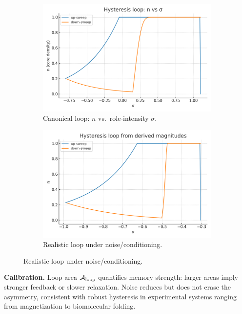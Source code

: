 \documentclass[12pt,a4paper,oneside]{scrreprt}
\begin{document}
\begin{figure}[htbp]\centering
  \begin{subfigure}[t]{0.49\linewidth}
    \includegraphics[width=\linewidth]{hysteresis_n_vs_sigma.png}
    \caption{Canonical loop: $n$ vs.\ role-intensity $\sigma$.}
    \label{fig:hyst:canon}
  \end{subfigure}\hfill
  \begin{subfigure}[t]{0.49\linewidth}
    \includegraphics[width=\linewidth]{realism_hysteresis_n_sigma.png}
    \caption{Realistic loop under noise/conditioning.}
    \label{fig:hyst:real}
  \end{subfigure}
\end{figure}

\noindent\textbf{Calibration.}  
Loop area $\mathcal A_{\rm loop}$ quantifies memory strength:  
larger areas imply stronger feedback or slower relaxation.  
Noise reduces but does not erase the asymmetry, consistent with robust hysteresis in experimental systems ranging from magnetization to biomolecular folding.
\end{document}
